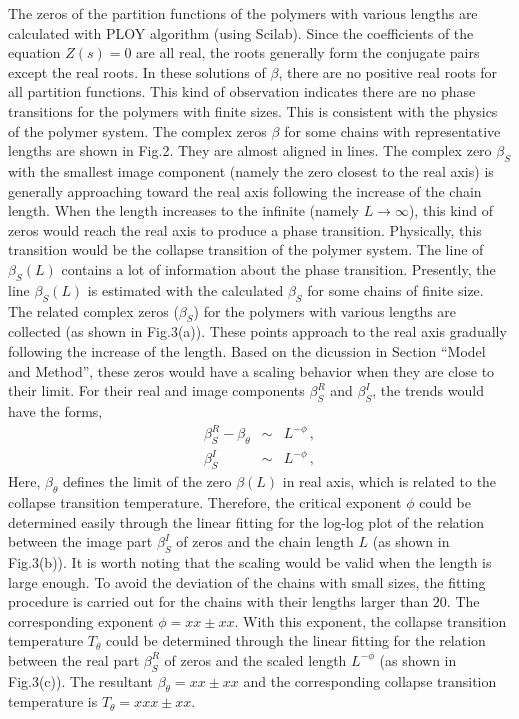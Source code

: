 \documentclass[preprint,preprintnumbers,amsmath,amssymb,showpacs,aps,pre]{revtex4-1}
\begin{document}
The zeros of the partition functions of the polymers with various lengths are
calculated with PLOY algorithm (using Scilab). Since the coefficients of the
equation $Z(s)=0$ are all real, the roots generally form the conjugate pairs
except the real roots. In these solutions of $\beta$, there are no positive real
roots for all partition functions. This kind of observation indicates there are no
phase transitions for the polymers with finite sizes. This is consistent with the
physics of the polymer system. The complex zeros $\beta$ for some chains with
representative lengths are shown in Fig.2. They are almost aligned in lines. The
complex zero $\beta_S$ with the smallest image component (namely the zero
closest to the real axis) is generally approaching toward the real axis following
the increase of the chain length. When the length increases to the infinite (namely
$L\rightarrow\infty$), this kind of zeros would reach the real axis to produce a
phase transition. Physically, this transition would be the collapse transition of the
polymer system. The line of $\beta_S(L)$ contains a lot of information about the
phase transition. Presently, the line $\beta_S(L)$ is estimated with the calculated
$\beta_S$ for some chains of finite size. The related complex zeros ($\beta_S$)
for the polymers with various lengths are collected (as shown in Fig.3(a)). These
points approach to the real axis gradually following the increase of the length. Based
on the dicussion in Section ``Model and Method'', these zeros would have a scaling
behavior when they are close to their limit. For their real and image components
$\beta_S^R$ and $\beta_S^I$, the trends would have the forms,
\begin{eqnarray}
\beta_S^R - \beta_{\theta}  &\sim&  L^{-\phi} \, , \\
\beta_S^I  &\sim&  L^{-\phi} \, ,
\end{eqnarray}
Here,
$\beta_{\theta}$ defines the limit of the zero $\beta(L)$ in real axis, which is
related to the collapse transition temperature. Therefore, the critical exponent
$\phi$ could be determined easily through the linear fitting for the log-log plot
of the relation between the image part $\beta_S^I$ of zeros and the chain length
$L$ (as shown in Fig.3(b)). It is worth noting that the scaling would be valid when
the length is large enough. To avoid the deviation of the chains with small sizes,
the fitting procedure is carried out for the chains with their lengths larger than
$20$. The corresponding exponent $\phi=xx \pm xx$. With this exponent, the
collapse transition temperature $T_{\theta}$ could be determined through the
linear fitting for the relation between the real part $\beta_S^R$ of zeros and
the scaled length $L^{-\phi}$ (as shown in Fig.3(c)). The resultant 
$\beta_{\theta}=xx \pm xx$ and the corresponding collapse transition
temperature is $T_{\theta}=xxx \pm xx$.
\end{document}
